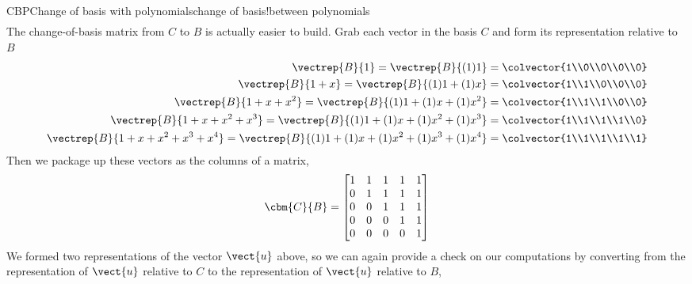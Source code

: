\begin{example}{CBP}{Change of basis with polynomials}{change of basis!between polynomials}
\begin{align*}
%
\end{align*}
%
The change-of-basis matrix from $C$ to $B$ is actually easier to build.  Grab each vector in the basis $C$ and form its representation relative to $B$
%
\begin{align*}
\vectrep{B}{1}
=\vectrep{B}{(1)1}
&=\colvector{1\\0\\0\\0\\0}\\
%
\vectrep{B}{1+x}
=\vectrep{B}{(1)1+(1)x}
&=\colvector{1\\1\\0\\0\\0}\\
%
\vectrep{B}{1+x+x^2}
=\vectrep{B}{(1)1+(1)x+(1)x^2}
&=\colvector{1\\1\\1\\0\\0}\\
%
\vectrep{B}{1+x+x^2+x^3}
=\vectrep{B}{(1)1+(1)x+(1)x^2+(1)x^3}
&=\colvector{1\\1\\1\\1\\0}\\
%
\vectrep{B}{1+x+x^2+x^3+x^4}
=\vectrep{B}{(1)1+(1)x+(1)x^2+(1)x^3+(1)x^4}
&=\colvector{1\\1\\1\\1\\1}\\
%
\end{align*}
Then we package up these vectors as the columns of a matrix,
%
\begin{equation*}
\cbm{C}{B}=
\begin{bmatrix}
1 & 1 & 1 & 1 & 1\\
0 & 1 & 1 & 1 & 1\\
0 & 0 & 1 & 1 & 1\\
0 & 0 & 0 & 1 & 1\\
0 & 0 & 0 & 0 & 1\\
\end{bmatrix}
\end{equation*}
%
We formed two representations of the vector $\vect{u}$ above, so we can again provide a check on our computations by converting from the representation of $\vect{u}$ relative to $C$ to the representation of $\vect{u}$ relative to $B$,
%
\begin{align*}

\end{align*}
\end{example}
